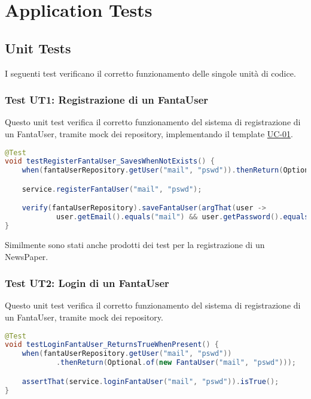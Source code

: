 \section{Application Tests}

\subsection{Unit Tests}

I seguenti test verificano il corretto funzionamento delle singole unità di codice.

\subsubsection{Test UT1: Registrazione di un FantaUser} \label{UT1}

Questo unit test verifica il corretto funzionamento del sistema di registrazione di un FantaUser, 
tramite mock dei repository, implementando il template \hyperref[UC-01]{UC-01}.

\begin{lstlisting}[language=Java]
@Test
void testRegisterFantaUser_SavesWhenNotExists() {
    when(fantaUserRepository.getUser("mail", "pswd")).thenReturn(Optional.empty());

    service.registerFantaUser("mail", "pswd");

    verify(fantaUserRepository).saveFantaUser(argThat(user ->
            user.getEmail().equals("mail") && user.getPassword().equals("pswd")));
}
\end{lstlisting}

Similmente sono stati anche prodotti dei test per la registrazione di un NewsPaper.


\subsubsection{Test UT2: Login di un FantaUser} \label{UT2}

Questo unit test verifica il corretto funzionamento del sistema di registrazione di un FantaUser, 
tramite mock dei repository.

\begin{lstlisting}[language=Java]
@Test
void testLoginFantaUser_ReturnsTrueWhenPresent() {
    when(fantaUserRepository.getUser("mail", "pswd"))
            .thenReturn(Optional.of(new FantaUser("mail", "pswd")));

    assertThat(service.loginFantaUser("mail", "pswd")).isTrue();
}
\end{lstlisting}


